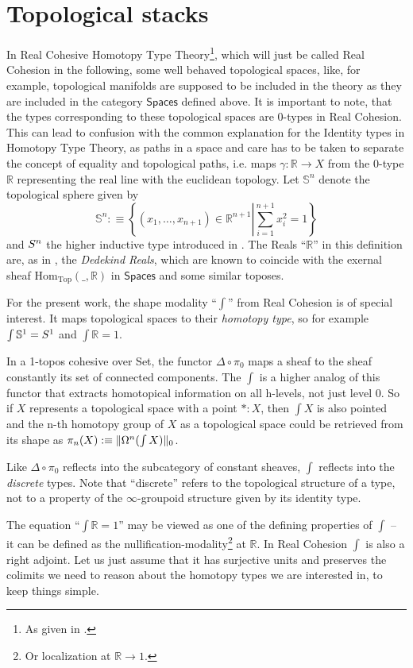 \documentclass[9pt,twosided]{amsart}
\newcommand{\shape}{\int}
\newcommand{\bR}{\mathbb R}
\newcommand{\bS}{\mathbb S}
\newcommand{\Spaces}{\ensuremath{\mathsf{Spaces}}}
\begin{document}
\section{Topological stacks}
\label{sec:topological_stacks}
In Real Cohesive Homotopy Type Theory\footnote{As given in \cite{ShulmanRealCohesion}.},
which will just be called Real Cohesion in the following, 
some well behaved topological spaces, like, for example, topological manifolds
are supposed to be included in the theory as they are included in the category $\Spaces$ defined above.
It is important to note, that the types corresponding to these topological spaces
are 0-types in Real Cohesion.
This can lead to confusion with the common explanation for the Identity types in Homotopy Type Theory,
as paths in a space and care has to be taken to separate the concept of equality
and topological paths, i.e. maps $\gamma:\bR\to X$ from the 0-type $\bR$ representing the real line with the euclidean topology.
Let $\bS^{n}$ denote the topological sphere given by
\[ \bS^{n}:\equiv\left\{ (x_1,\dots,x_{n+1})\in\bR^{n+1}\left\vert \sum_{i=1}^{n+1}x_i^2=1\right.\right\}\]
and $S^{n}$ the higher inductive type introduced in \cite{UFP}.
The Reals ``$\bR$'' in this definition are, as in \cite{ShulmanRealCohesion}, the \emph{Dedekind Reals},
which are known to coincide with the exernal sheaf $\mathrm{Hom}_{\mathrm{Top}}(\_,\bR)$ in $\Spaces$ and some similar toposes.

For the present work, the shape modality ``$\shape$'' from Real Cohesion is of special interest.
It maps topological spaces to their \emph{homotopy type}, so for example $\shape \bS^{1} =\sphere{1}$ 
and $\shape \bR =1$.


In a 1-topos cohesive over Set, the functor $\Delta\circ\pi_0$ maps a sheaf to the sheaf constantly its set of connected components.
The $\shape$ is a higher analog of this functor that extracts homotopical information on all h-levels, not just level 0.
So if $X$ represents a topological space with a point $\ast: X$, 
then $\shape X$ is also pointed and the n-th homotopy group of $X$ as a topological space 
could be retrieved from its shape 
as $\pi_n(X):\equiv\trunc{0}{\Omega^n(\shape X)}$.

Like $\Delta\circ\pi_0$ reflects into the subcategory of constant sheaves, $\shape$ reflects into the \emph{discrete} types.
Note that ``discrete'' refers to the topological structure of a type, 
not to a property of the $\infty$-groupoid structure given by its identity type.

The equation ``$\shape \bR=1$'' may be viewed as one of the defining properties of $\shape$
-- it can be defined as the nullification-modality\footnote{Or localization at $\bR\to 1$.} at $\bR$.
In Real Cohesion $\shape$ is also a right adjoint.
Let us just assume that it has surjective units and preserves the colimits we need to reason about the homotopy types we are interested in, to keep things simple.
\end{document}
